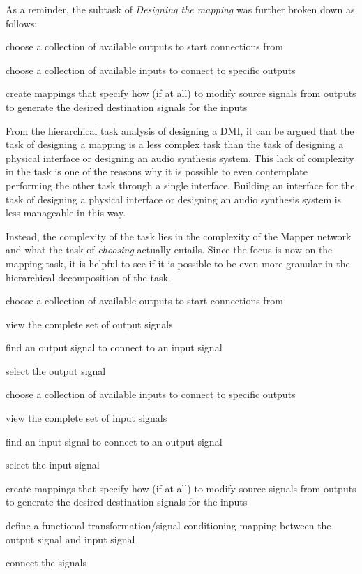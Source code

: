 As a reminder, the subtask of \emph{Designing the mapping} was further broken down as follows:

\begin{description}
	\item choose a collection of available outputs to start connections from
	\item choose a collection of available inputs to connect to specific outputs
	\item create mappings that specify how (if at all) to modify source signals from outputs to generate the desired destination signals for the inputs
\end{description}

From the hierarchical task analysis of designing a DMI, it can be argued that the task of designing a mapping is a less complex task than the task of designing a physical interface or designing an audio synthesis system. This lack of complexity in the task is one of the reasons why it is possible to even contemplate performing the other task through a single interface. Building an interface for the task of designing a physical interface or designing an audio synthesis system is less manageable in this way.

Instead, the complexity of the task lies in the complexity of the Mapper network and what the task of \emph{choosing} actually entails. Since the focus is now on the mapping task, it is helpful to see if it is possible to be even more granular in the hierarchical decomposition of the task. 

\begin{description}
	\item choose a collection of available outputs to start connections from
    \begin{description}
        \item view the complete set of output signals
        \item find an output signal to connect to an input signal
        \item select the output signal
    \end{description}
	\item choose a collection of available inputs to connect to specific outputs
    \begin{description}
        \item view the complete set of input signals
        \item find an input signal to connect to an output signal
        \item select the input signal
    \end{description}
	\item create mappings that specify how (if at all) to modify source signals from outputs to generate the desired destination signals for the inputs
    \begin{description}
        \item define a functional transformation/signal conditioning mapping between the output signal and input signal 
        \item connect the signals
    \end{description}
\end{description}

